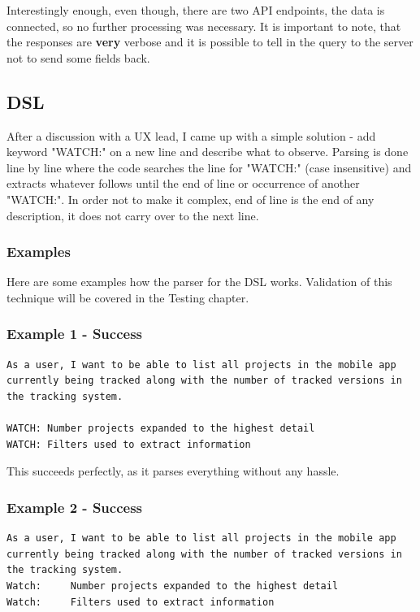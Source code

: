 Interestingly enough, even though, there are two API endpoints, the data is connected, so no further processing was necessary. It is important to note, that the responses are {\bf very} verbose and it is possible to tell in the query to the server not to send some fields back.

\subsection{DSL}

After a discussion with a UX lead, I came up with a simple solution - add keyword "WATCH:" on a new line and describe what to observe. Parsing is done line by line where the code searches the line for "WATCH:" (case insensitive) and extracts whatever follows until the end of line or occurrence of another "WATCH:". In order not to make it complex, end of line is the end of any description, it does not carry over to the next line.

\subsubsection{Examples}

Here are some examples how the parser for the DSL works. Validation of this technique will be covered in the Testing chapter.

\subsubsection*{Example 1 - Success}

\begin{lstlisting}
As a user, I want to be able to list all projects in the mobile app currently being tracked along with the number of tracked versions in the tracking system.

WATCH: Number projects expanded to the highest detail
WATCH: Filters used to extract information
\end{lstlisting}

This succeeds perfectly, as it parses everything without any hassle.

\subsubsection*{Example 2 - Success}

\begin{lstlisting}
As a user, I want to be able to list all projects in the mobile app currently being tracked along with the number of tracked versions in the tracking system. 
Watch:     Number projects expanded to the highest detail
Watch:     Filters used to extract information
\end{lstlisting}

